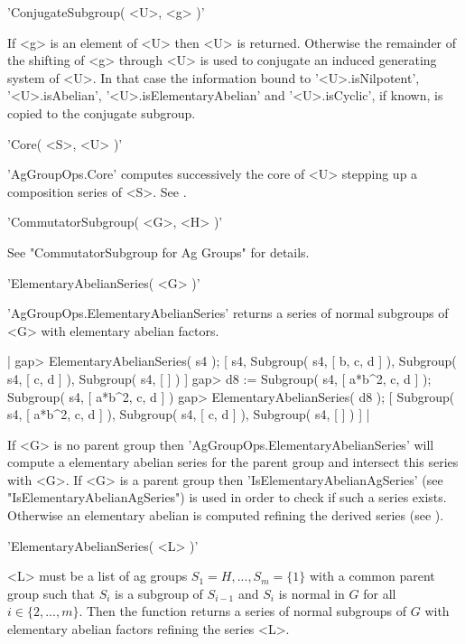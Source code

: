 \vspace{5mm}
'ConjugateSubgroup( <U>, <g> )'%

If <g>  is  an element  of   <U>  then  <U> is returned.    Otherwise the
remainder of the  shifting  of <g>  through <U> is  used  to conjugate an
induced generating system of  <U>. In that  case the information bound to
'<U>.isNilpotent',   '<U>.isAbelian',     '<U>.isElementaryAbelian'   and
'<U>.isCyclic', if known, is copied to the conjugate subgroup.

\vspace{5mm}
'Core( <S>, <U> )'

'AgGroupOps.Core' computes  successively  the core  of <U>  stepping up a
composition series of <S>. See \cite{Thi87}.

\vspace{5mm}
'CommutatorSubgroup( <G>, <H> )'%

See "CommutatorSubgroup for Ag Groups" for details.

\vspace{5mm}
'ElementaryAbelianSeries( <G> )'%

'AgGroupOps.ElementaryAbelianSeries' returns a series of normal subgroups
of <G> with elementary abelian factors.

|    gap> ElementaryAbelianSeries( s4 );
    [ s4, Subgroup( s4, [ b, c, d ] ), Subgroup( s4, [ c, d ] ),
      Subgroup( s4, [  ] ) ]
    gap> d8 := Subgroup( s4, [ a*b^2, c, d ] );
    Subgroup( s4, [ a*b^2, c, d ] )
    gap> ElementaryAbelianSeries( d8 );
    [ Subgroup( s4, [ a*b^2, c, d ] ), Subgroup( s4, [ c, d ] ),
      Subgroup( s4, [  ] ) ] |

If <G> is  no parent group then 'AgGroupOps.ElementaryAbelianSeries' will
compute a elementary abelian series  for the parent  group and  intersect
this   series   with    <G>.    If   <G>   is   a   parent   group   then
'IsElementaryAbelianAgSeries' (see "IsElementaryAbelianAgSeries") is used
in  order to  check  if such  a series exists.  Otherwise  an  elementary
abelian is computed refining the derived series (see \cite{LNS84,Gla87}).

\vspace{5mm}
'ElementaryAbelianSeries( <L> )'

<L> must be a list of ag groups $S_1 = H, ..., S_m = \{1\}$ with a common
parent group  such that $S_i$  is a subgroup of $S_{i-1}$   and  $S_i$ is
normal in $G$ for all $i\in \{2, ...,  m\}$.  Then the function returns a
series  of  normal subgroups of  $G$ with   elementary   abelian  factors
refining the series <L>.

